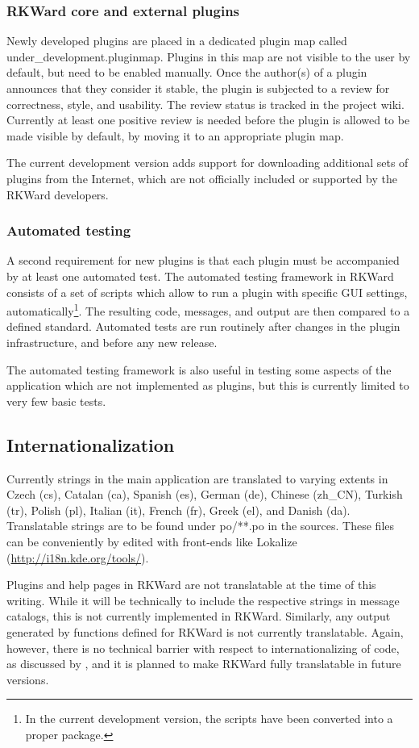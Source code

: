 \subsubsection{RKWard core and external plugins}
\label{sec:technical_processes_plugins}
Newly developed plugins are placed in a dedicated plugin map called
under\_development.pluginmap. Plugins in this map are not visible to the user by
default, but need to be enabled manually. Once the author(s) of a plugin
announces that they consider it stable, the plugin is subjected to a review for
correctness, style, and usability. The review status is tracked in the project
wiki. Currently at least one positive review is needed before the plugin is
allowed to be made visible by default, by moving it to an appropriate plugin
map.

The current development version adds support for downloading additional sets of
plugins from the Internet, which are not officially included or supported by the
RKWard developers.

\subsubsection{Automated testing}
\label{sec:technical_processes_automatedtesting}
A second requirement for new plugins is that each plugin must be accompanied by
at least one automated test. The automated testing framework in RKWard consists
of a set of  scripts which allow to run a plugin with specific GUI settings,
automatically\footnote{
  In the current development version, the scripts have been converted into a proper
   package.
}. The resulting  code,  messages, and output are then compared
to a defined standard. Automated tests are run routinely after changes in the
plugin infrastructure, and before any new release.

The automated testing framework is also useful in testing some aspects of the
application which are not implemented as plugins, but this is currently limited
to very few basic tests.

\subsection{Internationalization}
\label{sec:technical_internationalization}
Currently strings in the main application are translated to varying extents in
Czech (cs), Catalan (ca), Spanish (es), German (de), Chinese (zh\_CN), Turkish
(tr), Polish (pl), Italian (it), French (fr), Greek (el), and Danish (da).
Translatable strings are to be found under po/**.po in the sources. These files
can be conveniently by edited with front-ends like Lokalize
(\url{http://i18n.kde.org/tools/}). 

Plugins and help pages in RKWard are not translatable at the time of this
writing. While it will be technically to include the respective strings in
message catalogs, this is not currently implemented in RKWard. Similarly, any
output generated by  functions defined for RKWard is not currently
translatable. Again, however, there is no technical barrier with respect to
internationalizing of  code, as discussed by \cite{Ripley2005a},
and it is planned to make RKWard fully translatable in future versions.
